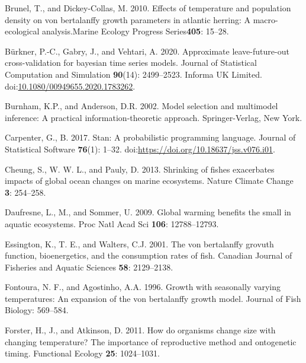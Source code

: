 \documentclass[
]{article}
\newlength{\cslhangindent}
\newlength{\cslentryspacingunit} %
\newenvironment{CSLReferences}[2] %
 {%
  \setlength{\parindent}{0pt}
  \ifodd #1
  \let\oldpar\par
  \def\par{\hangindent=\cslhangindent\oldpar}
  \fi
  \setlength{\parskip}{#2\cslentryspacingunit}
 }%
 {}
\newcommand{\meps}{Marine Ecology Progress Series\xspace}
\begin{document}
\begin{CSLReferences}{1}{0}
\leavevmode{}%
Brunel, T., and Dickey-Collas, M. 2010. Effects of temperature and
population density on von bertalanffy growth parameters in atlantic
herring: A macro-ecological analysis.\meps \textbf{405}: 15--28.

\leavevmode{}%
Bürkner, P.-C., Gabry, J., and Vehtari, A. 2020. Approximate
leave-future-out cross-validation for bayesian time series models.
Journal of Statistical Computation and Simulation \textbf{90}(14):
2499--2523. Informa {UK} Limited.
doi:\href{https://doi.org/10.1080/00949655.2020.1783262}{10.1080/00949655.2020.1783262}.

\leavevmode{}%
Burnham, K.P., and Anderson, D.R. 2002. Model selection and multimodel
inference: A practical information-theoretic approach. Springer-Verlag,
New York.

\leavevmode{}%
Carpenter, G., B. 2017. Stan: A probabilistic programming language.
Journal of Statistical Software \textbf{76}(1): 1--32.
doi:\url{https://doi.org/10.18637/jss.v076.i01}.

\leavevmode{}%
Cheung, S., W. W. L., and Pauly, D. 2013. Shrinking of fishes
exacerbates impacts of global ocean changes on marine ecosystems. Nature
Climate Change \textbf{3}: 254--258.

\leavevmode{}%
Daufresne, L., M., and Sommer, U. 2009. Global warming benefits the
small in aquatic ecosystems. Proc Natl Acad Sci \textbf{106}:
12788--12793.

\leavevmode{}%
Essington, K., T. E., and Walters, C.J. 2001. The von bertalanffy
grovuth function, bioenergetics, and the consumption rates of fish.
Canadian Journal of Fisheries and Aquatic Sciences \textbf{58}:
2129--2138.

\leavevmode{}%
Fontoura, N. F., and Agostinho, A.A. 1996. Growth with seasonally
varying temperatures: An expansion of the von bertalanffy growth model.
Journal of Fish Biology: 569--584.

\leavevmode{}%
Forster, H., J., and Atkinson, D. 2011. How do organisms change size
with changing temperature? The importance of reproductive method and
ontogenetic timing. Functional Ecology \textbf{25}: 1024--1031.


\end{CSLReferences}
\end{document}
